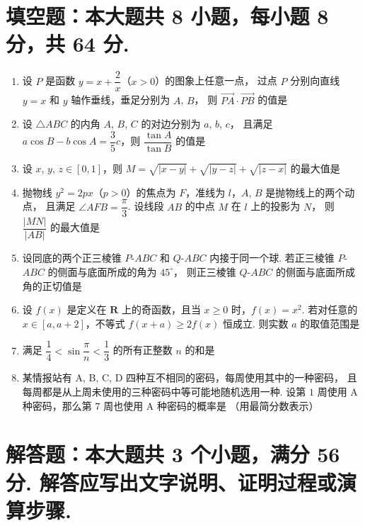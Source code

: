 \documentclass{chsmc}
\begin{document}
\section{填空题：本大题共 8 小题，每小题 8 分，共 64 分.}

\begin{enumerate}
	\item 设 $P$ 是函数 $y = x + \dfrac{2}{x}$（$x > 0$）的图象上任意一点，
		过点 $P$ 分别向直线 $y = x$ 和 $y$ 轴作垂线，垂足分别为 $A$, $B$，
		则 $\overrightarrow{PA}\cdot\overrightarrow{PB}$ 的值是 \blankline
	\item 设 $\triangle ABC$ 的内角 $A$, $B$, $C$ 的对边分别为 $a$, $b$, $c$，
		且满足 $a\cos B - b\cos A = \dfrac{3}{5}c$，则 $\dfrac{\tan A}{\tan B}$ 的值是 \blankline
	\item 设 $x$, $y$, $z \in [0,1]$，则
		$M = \sqrt{|x-y|} + \sqrt{|y-z|} + \sqrt{|z-x|}$ 的最大值是 \blankline
	\item 抛物线 $y^2 = 2px$（$p > 0$）的焦点为 $F$，准线为 $l$，$A$, $B$ 是抛物线上的两个动点，
		且满足 $\angle AFB = \dfrac{\pi}{3}$. 设线段 $AB$ 的中点 $M$ 在 $l$ 上的投影为 $N$，
		则 $\dfrac{|MN|}{|AB|}$ 的最大值是 \blankline
	\item 设同底的两个正三棱锥 $P$-$ABC$ 和 $Q$-$ABC$ 内接于同一个球.
		若正三棱锥 $P$-$ABC$ 的侧面与底面所成的角为 $45^\circ$，
		则正三棱锥 $Q$-$ABC$ 的侧面与底面所成角的正切值是 \blankline
	\item 设 $f(x)$ 是定义在 $\mathbf{R}$ 上的奇函数，且当 $x \geqslant 0$ 时，$f(x) = x^2$.
		若对任意的 $x \in [a,a+2]$，不等式 $f(x+a) \geqslant 2f(x)$ 恒成立.
		则实数 $a$ 的取值范围是 \blankline
	\item 满足 $\dfrac{1}{4} < \sin \dfrac{\pi}{n} < \dfrac{1}{3}$ 的所有正整数 $n$ 的和是 \blankline
	\item 某情报站有 A, B, C, D 四种互不相同的密码，每周使用其中的一种密码，
		且每周都是从上周未使用的三种密码中等可能地随机选用一种.
		设第 $1$ 周使用 A 种密码，那么第 $7$ 周也使用 A 种密码的概率是 \blankline（用最简分数表示）
\end{enumerate}

\section{解答题：本大题共 3 个小题，满分 56 分. 解答应写出文字说明、证明过程或演算步骤.}
\end{document}
